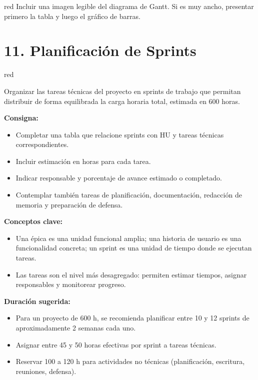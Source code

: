 \documentclass[
11pt, %
]{charter}
\begin{document}
\begin{consigna}{red}
Incluir una imagen legible del diagrama de Gantt. Si es muy ancho, presentar primero la tabla y luego el gráfico de barras.

\end{consigna} %


\section{11. Planificación de Sprints}

\begin{consigna}{red} %

Organizar las tareas técnicas del proyecto en sprints de trabajo que permitan distribuir de forma equilibrada la carga horaria total, estimada en 600 horas.

\textbf{Consigna:}
\begin{itemize}
  \item Completar una tabla que relacione sprints con HU y tareas técnicas correspondientes.
  \item Incluir estimación en horas para cada tarea.
  \item Indicar responsable y porcentaje de avance estimado o completado.
  \item Contemplar también tareas de planificación, documentación, redacción de memoria y preparación de defensa.
\end{itemize}

\textbf{Conceptos clave:}
\begin{itemize}
  \item Una \'{e}pica es una unidad funcional amplia; una historia de usuario es una funcionalidad concreta; un sprint es una unidad de tiempo donde se ejecutan tareas.
  \item Las tareas son el nivel más desagregado: permiten estimar tiempos, asignar responsables y monitorear progreso.
\end{itemize}

\textbf{Duración sugerida:}
\begin{itemize}
  \item Para un proyecto de 600 h, se recomienda planificar entre 10 y 12 sprints de aproximadamente 2 semanas cada uno.
  \item Asignar entre 45 y 50 horas efectivas por sprint a tareas técnicas.
  \item Reservar 100 a 120 h para actividades no técnicas (planificación, escritura, reuniones, defensa).
\end{itemize}


\end{consigna}
\end{document}
